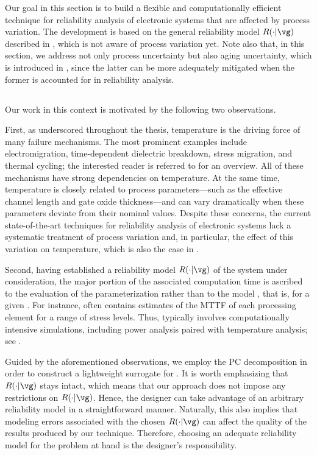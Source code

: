 Our goal in this section is to build a flexible and computationally efficient
technique for reliability analysis of electronic systems that are affected by
process variation. The development is based on the general reliability model
$R(\cdot | \vg)$ described in , which is not aware of
process variation yet. Note also that, in this section, we address not only
process uncertainty but also aging uncertainty, which is introduced in
, since the latter can be more adequately mitigated when
the former is accounted for in reliability analysis.

\subsection{\problemtitle}

Our work in this context is motivated by the following two observations.

First, as underscored throughout the thesis, temperature is the driving force of
many failure mechanisms. The most prominent examples include electromigration,
time-dependent dielectric breakdown, stress migration, and thermal cycling; the
interested reader is referred to \cite{jedec2016} for an overview. All of these
mechanisms have strong dependencies on temperature. At the same time,
temperature is closely related to process parameters---such as the effective
channel length and gate oxide thickness---and can vary dramatically when these
parameters deviate from their nominal values. Despite these concerns, the
current state-of-the-art techniques for reliability analysis of electronic
systems lack a systematic treatment of process variation and, in particular, the
effect of this variation on temperature, which is also the case in
.

Second, having established a reliability model $R(\cdot | \vg)$ of the system
under consideration, the major portion of the associated computation time is
ascribed to the evaluation of the parameterization \vg rather than to the model
\perse, that is, for a given \vg. For instance, \vg often contains estimates of
the \ac{MTTF} of each processing element for a range of stress levels. Thus, \vg
typically involves computationally intensive simulations, including power
analysis paired with temperature analysis; see .

Guided by the aforementioned observations, we employ the \ac{PC} decomposition
in order to construct a lightweight surrogate for \vg. It is worth emphasizing
that $R(\cdot | \vg)$ stays intact, which means that our approach does not
impose any restrictions on $R(\cdot | \vg)$. Hence, the designer can take
advantage of an arbitrary reliability model in a straightforward manner.
Naturally, this also implies that modeling errors associated with the chosen
$R(\cdot | \vg)$ can affect the quality of the results produced by our
technique. Therefore, choosing an adequate reliability model for the problem at
hand is the designer's responsibility.

